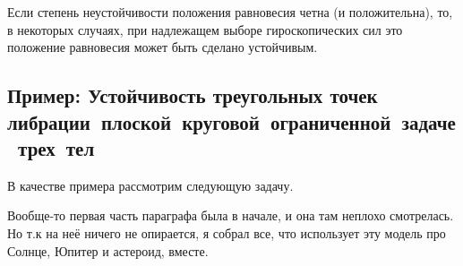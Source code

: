 \documentclass[a4paper,12pt]{article}
\begin{document}
\begin{note}
Если степень неустойчивости положения равновесия четна (и положительна), то, в некоторых случаях,
при надлежащем выборе гироскопических сил это положение равновесия может быть сделано устойчивым.
\end{note}

\subsection{Пример: Устойчивость треугольных точек либрации~плоской~круговой~ограниченной~задаче~трех~тел}
В качестве примера рассмотрим следующую задачу.
\begin{petit}
  Вообще-то первая часть параграфа была в начале, и она там неплохо
  смотрелась. Но т.к на неё ничего не опирается, я собрал все, что
  использует эту модель про Солнце, Юпитер и астероид, вместе.
\end{petit}
\label{sssec:three-solid-problem}
\end{document}
